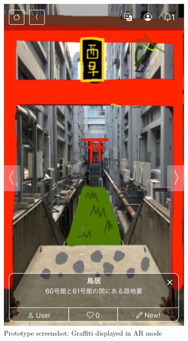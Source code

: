 \begin{figure}
  \begin{minipage}{0.48\textwidth}
    \centering
    \includegraphics[width=0.9\linewidth]{resources/4_methodology/prototype_graffiti.png}
      \caption{Prototype screenshot: Graffiti displayed in AR mode}
  \end{minipage}\hfill
  \begin{minipage}{0.48\textwidth}
    \centering

\end{minipage}
\end{figure}
